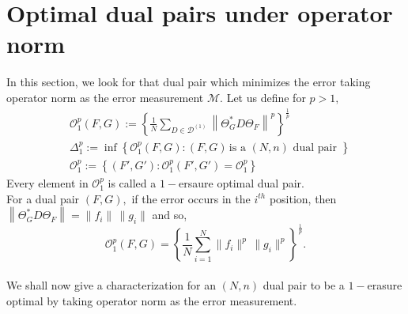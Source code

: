 \documentclass[final,1p,times]{elsarticle}
\begin{document}
	\section{Optimal dual pairs under operator norm}
In this section, we look for that dual pair which minimizes the error taking operator norm as the error measurement $\mathcal{M}.$ Let us define for $p >1,$
\begin{align*}
	&\mathcal{O}_{1}^p (F,G) := \left\{\frac{1}{N} \sum\limits_{D \in \mathcal{D}^{(1)}} \left\| \Theta_{G}^*D\Theta_{F}\right\|^p\right\}^{\frac{1}{p}} \;\\
	& \Delta_{1}^p  := \inf\left\{ \mathcal{O}_{1}^p (F,G) : (F,G)\, \text{is a $(N,n)$ dual pair }   \right\}\\
	&  \mathcal{O}_{1}^p := \left\{(F',G'): \mathcal{O}_{1}^p (F',G') =  \mathcal{O}_{1}^p \right\}
\end{align*}
Every element in $ \mathcal{O}_{1}^p$ is called a $1-$ersaure  optimal dual pair.\\
For a dual pair $(F,G),$ if the error occurs in the $i^{th}$ position, then $\left\|\Theta_{G}^*D\Theta_{F}\right\| = \|f_i\|\,\| g_i \|  $ and so,
\begin{equation}\label{equation6}
	\mathcal{O}_{1}^p (F,G) = \left\{\frac{1}{N} \sum \limits_{i=1}^N\|f_i\|^p\,\| g_i \| ^p\right\}^{\frac{1}{p}}.
\end{equation}\\
We shall now give a characterization for an $(N,n)$ dual pair to be a $1-$erasure optimal by taking operator norm as the error measurement.
\end{document}
